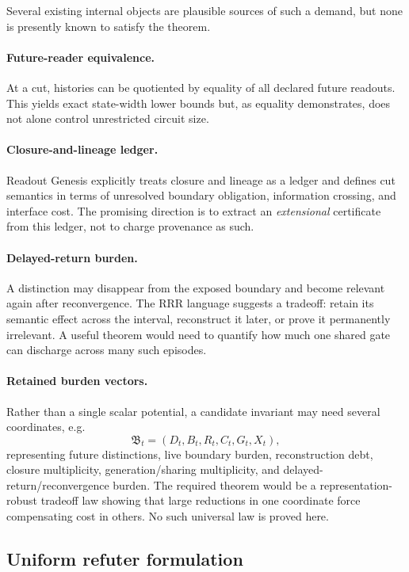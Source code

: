 \documentclass[11pt]{article}
\begin{document}
Several existing internal objects are plausible sources of such a demand, but none is presently known to satisfy the theorem.

\paragraph{Future-reader equivalence.}
At a cut, histories can be quotiented by equality of all declared future readouts. This yields exact state-width lower bounds but, as equality demonstrates, does not alone control unrestricted circuit size.

\paragraph{Closure-and-lineage ledger.}
Readout Genesis explicitly treats closure and lineage as a ledger and defines cut semantics in terms of unresolved boundary obligation, information crossing, and interface cost. The promising direction is to extract an \emph{extensional} certificate from this ledger, not to charge provenance as such.

\paragraph{Delayed-return burden.}
A distinction may disappear from the exposed boundary and become relevant again after reconvergence. The RRR language suggests a tradeoff: retain its semantic effect across the interval, reconstruct it later, or prove it permanently irrelevant. A useful theorem would need to quantify how much one shared gate can discharge across many such episodes.

\paragraph{Retained burden vectors.}
Rather than a single scalar potential, a candidate invariant may need several coordinates, e.g.
\[
\mathfrak B_t=(D_t,B_t,R_t,C_t,G_t,X_t),
\]
representing future distinctions, live boundary burden, reconstruction debt, closure multiplicity, generation/sharing multiplicity, and delayed-return/reconvergence burden. The required theorem would be a representation-robust tradeoff law showing that large reductions in one coordinate force compensating cost in others. No such universal law is proved here.

\subsection{Uniform refuter formulation}
\end{document}
